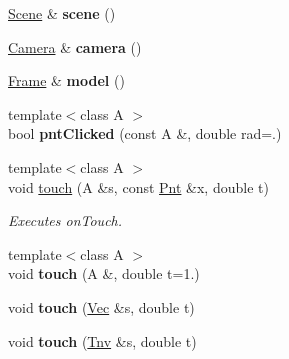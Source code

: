 \begin{DoxyCompactItemize}
\item 
\hypertarget{classvsr_1_1_interface_a2ab1bef892e3e2084ed27c0e975dea3b}{\hyperlink{classvsr_1_1_scene}{Scene} \& {\bfseries scene} ()}\label{classvsr_1_1_interface_a2ab1bef892e3e2084ed27c0e975dea3b}

\item 
\hypertarget{classvsr_1_1_interface_a04650413d56d3a6a5b4dabf6391dec2e}{\hyperlink{classvsr_1_1_camera}{Camera} \& {\bfseries camera} ()}\label{classvsr_1_1_interface_a04650413d56d3a6a5b4dabf6391dec2e}

\item 
\hypertarget{classvsr_1_1_interface_ac951d397ab79a17ec8723cb13a1e315f}{\hyperlink{classvsr_1_1_frame}{Frame} \& {\bfseries model} ()}\label{classvsr_1_1_interface_ac951d397ab79a17ec8723cb13a1e315f}

\item 
\hypertarget{classvsr_1_1_interface_a5f7b6eca12ae94633a83f5e8df0af9f3}{{\footnotesize template$<$class A $>$ }\\bool {\bfseries pnt\-Clicked} (const A \&, double rad=.)}\label{classvsr_1_1_interface_a5f7b6eca12ae94633a83f5e8df0af9f3}

\item 
\hypertarget{classvsr_1_1_interface_a38628d7fa3935fd6f34b975d5e087e6a}{{\footnotesize template$<$class A $>$ }\\void \hyperlink{classvsr_1_1_interface_a38628d7fa3935fd6f34b975d5e087e6a}{touch} (A \&s, const \hyperlink{namespacevsr_a2d05beb9721c5d9211b479af6d47222d}{Pnt} \&x, double t)}\label{classvsr_1_1_interface_a38628d7fa3935fd6f34b975d5e087e6a}

\begin{DoxyCompactList}\small\item\em Executes on\-Touch. \end{DoxyCompactList}\item 
\hypertarget{classvsr_1_1_interface_a9f1ae1b48b70c0b16ac40064a10c1026}{{\footnotesize template$<$class A $>$ }\\void {\bfseries touch} (A \&, double t=1.)}\label{classvsr_1_1_interface_a9f1ae1b48b70c0b16ac40064a10c1026}

\item 
\hypertarget{classvsr_1_1_interface_a6b50417345897f5f0dc59877060b4f5d}{void {\bfseries touch} (\hyperlink{namespacevsr_a0d061c30ac198a710a1b92dd8b343273}{Vec} \&s, double t)}\label{classvsr_1_1_interface_a6b50417345897f5f0dc59877060b4f5d}

\item 
\hypertarget{classvsr_1_1_interface_abf451396468f5f45367bcfcf0946548c}{void {\bfseries touch} (\hyperlink{namespacevsr_a042664cb2545c7ef14aeb5e5e5d092de}{Tnv} \&s, double t)}\label{classvsr_1_1_interface_abf451396468f5f45367bcfcf0946548c}


\end{DoxyCompactItemize}
